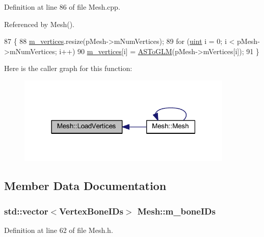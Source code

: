 Definition at line 86 of file Mesh.\+cpp.



Referenced by Mesh().


\begin{DoxyCode}
87 \{
88   \hyperlink{class_mesh_acdb6a67de9921b11a4f091288c4a1504}{m\_vertices}.resize(pMesh->mNumVertices);
89   \textcolor{keywordflow}{for} (\hyperlink{_types_8h_a4f5fce8c1ef282264f9214809524d836}{uint} i = 0; i < pMesh->mNumVertices; i++)
90     \hyperlink{class_mesh_acdb6a67de9921b11a4f091288c4a1504}{m\_vertices}[i] = \hyperlink{_assimp_to_g_l_m_8cpp_a1b03f2444f2a24982dd5a2c84b50cf98}{ASToGLM}(pMesh->mVertices[i]);
91 \}
\end{DoxyCode}


Here is the caller graph for this function\+:\nopagebreak
\begin{figure}[H]
\begin{center}
\leavevmode
\includegraphics[width=291pt]{class_mesh_aa7bc703b77e0bdfcb5e0ca9d501c76f5_icgraph}
\end{center}
\end{figure}




\subsection{Member Data Documentation}
\subsubsection[{\texorpdfstring{m\+\_\+bone\+I\+Ds}{m_boneIDs}}]{\setlength{\rightskip}{0pt plus 5cm}std\+::vector$<${\bf Vertex\+Bone\+I\+Ds}$>$ Mesh\+::m\+\_\+bone\+I\+Ds\hspace{0.3cm}{\ttfamily [private]}}\hypertarget{class_mesh_a453ac697baeb3f4f1135e95650777df8}{}\label{class_mesh_a453ac697baeb3f4f1135e95650777df8}


Definition at line 62 of file Mesh.\+h.

